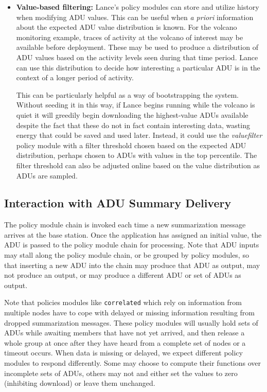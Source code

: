 \begin{itemize}
\item \textbf{Value-based filtering:} Lance's policy modules can store and
utilize history when modifying ADU values. This can be useful when \textit{a
priori} information about the expected ADU value distribution is known. For
the volcano monitoring example, traces of activity at the volcano of interest
may be available before deployment. These may be used to produce a
distribution of ADU values based on the activity levels seen during that time
period. Lance can use this distribution to decide how interesting a
particular ADU is in the context of a longer period of activity.

\hspace{0.25in} This can be particularly helpful as a way of bootstrapping
the system. Without seeding it in this way, if Lance begins running while the
volcano is quiet it will greedily begin downloading the highest-value ADUs
available despite the fact that these do not in fact contain interesting
data, wasting energy that could be saved and used later. Instead, it could
use the \textit{valuefilter} policy module with a filter threshold chosen
based on the expected ADU distribution, perhaps chosen to ADUs with values in
the top percentile. The filter threshold can also be adjusted online based on
the value distribution as ADUs are sampled.

\end{itemize}

\subsection{Interaction with ADU Summary Delivery}

The policy module chain is invoked each time a new summarization message
arrives at the base station. Once the application has assigned an initial
value, the ADU is passed to the policy module chain for processing. Note that
ADU inputs may stall along the policy module chain, or be grouped by policy
modules, so that inserting a new ADU into the chain may produce that ADU as
output, may not produce an output, or may produce a different ADU or set of
ADUs as output.

Note that policies modules like \texttt{correlated} which rely on information
from multiple nodes have to cope with delayed or missing information
resulting from dropped summarization messages. These policy modules will
usually hold sets of ADUs while awaiting members that have not yet arrived,
and then release a whole group at once after they have heard from a complete
set of nodes or a timeout occurs. When data is missing or delayed, we expect
different policy modules to respond differently. Some may choose to compute
their functions over incomplete sets of ADUs, others may not and either set
the values to zero (inhibiting download) or leave them unchanged.

